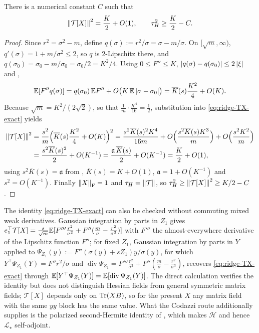 \begin{lemma}
\label{lem:ridge-TX-size}
There is a numerical constant $C$ such that
\begin{equation}
\label{eq:ridge-tau-lower}
    \left\lVert \mathcal T[X]\right\rVert^2=\frac K2+O(1),
    \qquad
    \tau_H^2\geq\frac K2-C .
\end{equation}
\end{lemma}

\begin{proof}
Since $r^2=\sigma^2-m$, define $q(\sigma):=r^2/\sigma=\sigma-m/\sigma$. On $[\sqrt m,\infty)$,
$q'(\sigma)=1+m/\sigma^2\leq2$, so $q$ is $2$-Lipschitz there, and
$q(\sigma_0)=\sigma_0-m/\sigma_0=\sigma_0/2=K^2/4$. Using $0\leq F''\leq K$,
$\left\lvert q(\sigma)-q(\sigma_0)\right\rvert\leq2\left\lvert \xi\right\rvert$ and ,
\[
    \mathbb{E}[F''q(\sigma)]
    =q(\sigma_0)\,\mathbb{E} F''+O\bigl(K\,\mathbb{E}\left\lvert \sigma-\sigma_0\right\rvert\bigr)
    =\overline K(s)\frac{K^2}4+O(K).
\]
Because $\sqrt m=K^2/(2\sqrt2)$, so that $\tfrac1m\cdot\tfrac{K^4}{16}=\tfrac12$, substitution
into \eqref{eq:ridge-TX-exact} yields
\[
\begin{aligned}
    \left\lVert \mathcal T[X]\right\rVert^2
    &=\frac{s^2}m\Bigl(\overline K(s)\frac{K^2}4+O(K)\Bigr)^2
    =\frac{s^2\overline K(s)^2K^4}{16m}
    +O\Bigl(\frac{s^2\overline K(s)K^3}m\Bigr)+O\Bigl(\frac{s^2K^2}m\Bigr)\\
    &=\frac{s^2\overline K(s)^2}2+O(K^{-1})
    =\frac{\mathfrak a\,\overline K(s)}2+O(K^{-1})
    =\frac K2+O(1),
\end{aligned}
\]
using $s^2\overline K(s)=\mathfrak a$ from ,
$\overline K(s)=K+O(1)$, $\mathfrak a=1+O(K^{-1})$ and $s^2=O(K^{-1})$. Finally
$\left\lVert X\right\rVert_{\mathrm{F}}=1$ and $\tau_H=\left\lVert \mathcal T\right\rVert$, so
$\tau_H^2\geq\left\lVert \mathcal T[X]\right\rVert^2\geq K/2-C$.
\end{proof}

\begin{remark}
\label{rem:ridge-crosscheck}
The identity \eqref{eq:ridge-TX-exact} can also be checked without commuting mixed weak
derivatives. Gaussian integration by parts in $Z_1$ gives
$e_1^\top\mathcal T[X]=\tfrac s{\sqrt m}\mathbb{E}[F'''\tfrac{r^2}{\sigma^2}+F''(\tfrac m\sigma-\tfrac{r^2}{\sigma^3})]$
with $F'''$ the almost-everywhere derivative of the Lipschitz function $F''$; for fixed $Z_1$,
Gaussian integration by parts in $Y$ applied to
$\Psi_{Z_1}(y):=F''(\sigma(y)+sZ_1)y/\sigma(y)$, for which
$Y^\top\Psi_{Z_1}(Y)=F''r^2/\sigma$ and
$\operatorname{div}\Psi_{Z_1}=F'''\tfrac{r^2}{\sigma^2}+F''(\tfrac m\sigma-\tfrac{r^2}{\sigma^3})$,
recovers \eqref{eq:ridge-TX-exact} through
$\mathbb{E}[Y^\top\Psi_{Z_1}(Y)]=\mathbb{E}[\operatorname{div}\Psi_{Z_1}(Y)]$. The direct calculation verifies
the identity but does not distinguish Hessian fields from general symmetric matrix fields;
$\mathcal T[X]$ depends only on $\operatorname{Tr}(XB)$, so for the present $X$ any matrix field with the
same $yy$ block has the same value. What the Codazzi route additionally supplies is the
polarized second-Hermite identity of , which makes $\mathcal H$ and hence
$\mathcal L_\star$ self-adjoint.
\end{remark}

